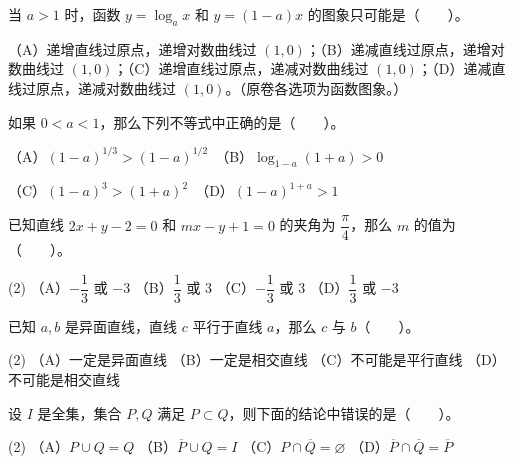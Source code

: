 \Needspace{0.4\textheight}
\begin{question}
当 $a>1$ 时，函数 $y=\log_a x$ 和 $y=(1-a)x$ 的图象只可能是\mbox{（　　）}。

（A）递增直线过原点，递增对数曲线过 $(1,0)$；（B）递减直线过原点，递增对数曲线过 $(1,0)$；（C）递增直线过原点，递减对数曲线过 $(1,0)$；（D）递减直线过原点，递减对数曲线过 $(1,0)$。（原卷各选项为函数图象。）
\nopagebreak[4]
\begin{center}\end{center}
\nopagebreak[4]
\end{question}
\begin{question}
如果 $0<a<1$，那么下列不等式中正确的是\mbox{（　　）}。

（A）$(1-a)^{1/3}>(1-a)^{1/2}$　（B）$\log_{1-a}(1+a)>0$

（C）$(1-a)^3>(1+a)^2$　（D）$(1-a)^{1+a}>1$

\end{question}
\begin{question}
已知直线 $2x+y-2=0$ 和 $mx-y+1=0$ 的夹角为 $\dfrac\pi4$，那么 $m$ 的值为\mbox{（　　）}。

\begin{gkopts}(2)
\task （A）$-\dfrac13$ 或 $-3$
\task （B）$\dfrac13$ 或 $3$
\task （C）$-\dfrac13$ 或 $3$
\task （D）$\dfrac13$ 或 $-3$
\end{gkopts}

\end{question}
\begin{question}
已知 $a,b$ 是异面直线，直线 $c$ 平行于直线 $a$，那么 $c$ 与 $b$\mbox{（　　）}。

\begin{gkopts}(2)
\task （A）一定是异面直线
\task （B）一定是相交直线
\task （C）不可能是平行直线
\task （D）不可能是相交直线
\end{gkopts}

\end{question}
\begin{question}
设 $I$ 是全集，集合 $P,Q$ 满足 $P\subset Q$，则下面的结论中错误的是\mbox{（　　）}。

\begin{gkopts}(2)
\task （A）$P\cup Q=Q$
\task （B）$\overline P\cup Q=I$
\task （C）$P\cap\overline Q=\varnothing$
\task （D）$\overline P\cap\overline Q=\overline P$
\end{gkopts}

\end{question}
